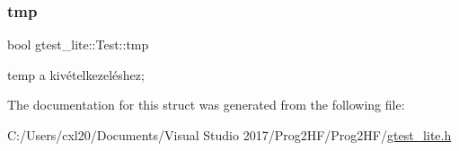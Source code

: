 \subsubsection{\texorpdfstring{tmp}{tmp}}
{\footnotesize\ttfamily bool gtest\+\_\+lite\+::\+Test\+::tmp}



temp a kivételkezeléshez; 



The documentation for this struct was generated from the following file\+:\begin{DoxyCompactItemize}
\item 
C\+:/\+Users/cxl20/\+Documents/\+Visual Studio 2017/\+Prog2\+H\+F/\+Prog2\+H\+F/\mbox{\hyperlink{gtest__lite_8h}{gtest\+\_\+lite.\+h}}\end{DoxyCompactItemize}
